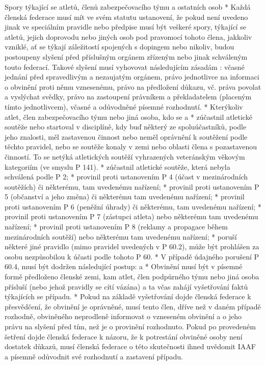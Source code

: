 Spory týkající se atletů, členů zabezpečovacího týmu a ostatních osob
* Každá členská federace musí mít ve svém statutu ustanovení, že pokud není uvedeno jinak ve speciálním pravidle nebo předpise musí být veškeré spory, týkající se atletů, jejich doprovodu nebo jiných osob pod pravomocí tohoto člena, jakkoliv vzniklé, ať se týkají záležitostí spojených s dopingem nebo nikoliv, budou postoupeny slyšení před příslušným orgánem zřízeným nebo jinak schváleným touto federací. Takové slyšení musí vyhovovat následujícím zásadám : včasné jednání před spravedlivým a nezaujatým orgánem, právo jednotlivce na informaci o obvinění proti němu vznesenému, právo na předložení důkazu, vč. práva povolat a vyslýchat svědky, právo na zastoupení právníkem a překladatelem (placeným tímto jednotlivcem), včasné a odůvodněné písemné rozhodnutí.
* Kterýkoliv atlet, člen zabezpečovacího týmu nebo jiná osoba, kdo se
  \begitems \style a
  * zúčastnil atletické soutěže nebo startoval v disciplíně, kdy buď některý ze spoluúčastníků, podle jeho znalosti, měl zastavenou činnost nebo neměl oprávnění k soutěžení podle těchto pravidel, nebo se soutěže konaly v zemi nebo oblasti člena s pozastavenou činností. To se netýká atletických soutěží vyhrazených veteránským věkovým kategoriím (ve smyslu P 141).
  * zúčastnil atletické soutěže, která nebyla schválená podle P 2;
  * provinil proti ustanovením P 4 (účast v mezinárodních soutěžích) či některému, tam uvedenému nařízení;
  * provinil proti ustanovením P 5 (občanství a jeho změna) či některému tam uvedenému nařízení;
  * provinil proti ustanovením P 6 (peněžní úhrady) či některému, tam uvedenému nařízení;
  * provinil proti ustanovením P 7 (zástupci atleta) nebo některému tam uvedenému nařízení;
  * provinil proti ustanovením P 8 (reklamy a propagace během mezinárodních soutěží) nebo některému tam uvedenému nařízení;
  * poruší některé jiné pravidlo (mimo pravidel uvedených v P 60.2),
  \enditems
může být prohlášen za osobu nezpůsobilou k účasti podle tohoto P 60.
* V případě údajného porušení P 60.4, musí být dodržen následující postup:
  \begitems \style a
  * Obvinění musí být v písemné formě předloženo členské zemi, kam atlet, člen podpůrného týmu nebo jiná osoba přísluší (nebo jehož pravidly se cítí vázána) a ta včas zahájí vyšetřování faktů týkajících se případu.
  * Pokud na základě vyšetřování dojde členská federace k přesvědčení, že obvinění je oprávněné, musí tento člen, dříve než v daném případě rozhodně, obviněného neprodleně informovat o vzneseném obvinění a o jeho právu na slyšení před tím, než je o provinění rozhodnuto. Pokud po provedeném šetření dojde členská federace k názoru, že k potrestání obviněné osoby není dostatek důkazů, musí členská federace o této skutečnosti ihned uvědomit IAAF a písemně odůvodnit své rozhodnutí a zastavení případu.
